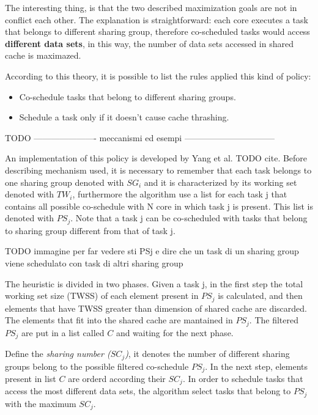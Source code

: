 The interesting thing, is that the two described maximization goals are not in conflict each other. The explanation is straightforward: each core executes 
a task that belongs to different sharing group, therefore co-scheduled tasks would access \textbf{different data sets}, in this way, the number of data sets 
accessed in shared cache is maximazed.

According to this theory, it is possible to list the rules applied this kind of policy:

\begin{itemize}
	\item Co-schedule tasks that belong to different sharing groups. 
	\item Schedule a task only if it doesn't cause cache thrashing.
\end{itemize}

TODO ---------------------- meccanismi ed esempi --------------------------------

An implementation of this policy is developed by Yang et al. TODO cite. Before describing mechanism used, it is necessary to remember that each task 
belongs to one sharing group denoted with $SG_i$ and it is characterized by its working set denoted with $TW_i$, furthermore the algorithm use a list
for each task j that contains all possible co-schedule with N core in which task j is present. This list is denoted with $PS_j$. Note that a task j can be 
co-scheduled with tasks that belong to sharing group different from that of task j.

TODO immagine per far vedere sti PSj e dire che un task di un sharing group viene schedulato con task di altri sharing group

The heuristic is divided in two phases. Given a task j, in the first step the total working set size (TWSS) of each element present in $PS_j$ is calculated,
and then elements that have TWSS greater than dimension of shared cache are discarded. The elements that fit into the shared cache are mantained in $PS_j$.
The filtered $PS_j$ are put in a list called $C$ and waiting for the next phase.

Define the \textit{sharing number ($SC_j$)}, it denotes the number of different sharing groups belong to the possible filtered co-schedule $PS_j$. In the 
next step, elements present in list $C$ are orderd according their $SC_j$. In order to schedule tasks that access the most different data sets, the 
algorithm select tasks that belong to $PS_j$ with the maximum $SC_j$.

